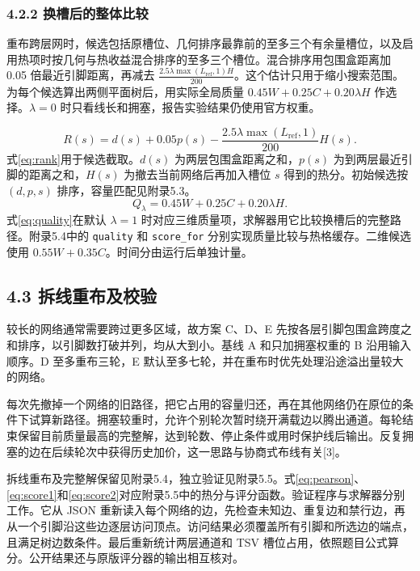 \documentclass[12pt,a4paper]{article}
\begin{document}
\subsubsection{4.2.2
换槽后的整体比较}\label{ux6362ux69fdux540eux7684ux6574ux4f53ux6bd4ux8f83}

重布跨层网时，候选包括原槽位、几何排序最靠前的至多三个有余量槽位，以及启用热项时按几何与热收益混合排序的至多三个槽位。混合排序用包围盒距离加
0.05 倍最近引脚距离，再减去
\(\frac{2.5\lambda\max(L_{\mathrm{ref}},1)H}{200}\)。这个估计只用于缩小搜索范围。为每个候选算出两侧平面树后，用实际全局质量
\(0.45W+0.25C+0.20\lambda H\) 作选择。\(\lambda=0\)
时只看线长和拥塞，报告实验结果仍使用官方权重。

\begin{equation}
R(s)=d(s)+0.05p(s)-\frac{2.5\lambda\max(L_{\mathrm{ref}},1)}{200}H(s).
\label{eq:rank}
\end{equation}
式\eqref{eq:rank}用于候选截取。$d(s)$ 为两层包围盒距离之和，$p(s)$ 为到两层最近引脚的距离之和，$H(s)$ 为撤去当前网络后再加入槽位 $s$ 得到的热分。初始候选按 $(d,p,s)$ 排序，容量匹配见附录5.3。
\begin{equation}
Q_{\lambda}=0.45W+0.25C+0.20\lambda H.
\label{eq:quality}
\end{equation}
式\eqref{eq:quality}在默认 $\lambda=1$ 时对应三维质量项，求解器用它比较换槽后的完整路径。附录5.4中的 \texttt{quality} 和 \texttt{score\_for} 分别实现质量比较与热格缓存。二维候选使用 $0.55W+0.35C$。时间分由运行后单独计量。
\subsection{4.3
拆线重布及校验}\label{ux62c6ux7ebfux91cdux5e03ux53caux6821ux9a8c}

较长的网络通常需要跨过更多区域，故方案 C、D、E
先按各层引脚包围盒跨度之和排序，以引脚数打破并列，均从大到小。基线 A
和只加拥塞权重的 B 沿用输入顺序。D 至多重布三轮，E
默认至多七轮，并在重布时优先处理沿途溢出量较大的网络。

每次先撤掉一个网络的旧路径，把它占用的容量归还，再在其他网络仍在原位的条件下试算新路径。拥塞较重时，允许个别轮次暂时绕开满载边以腾出通道。每轮结束保留目前质量最高的完整解，达到轮数、停止条件或用时保护线后输出。反复拥塞的边在后续轮次中获得历史加价，这一思路与协商式布线有关{[}3{]}。

拆线重布及完整解保留见附录5.4，独立验证见附录5.5。式\eqref{eq:pearson}、\allowbreak\eqref{eq:score1}和\allowbreak\eqref{eq:score2}对应附录5.5中的热分与评分函数。验证程序与求解器分别工作。它从 JSON
重新读入每个网络的边，先检查未知边、重复边和禁行边，再从一个引脚沿这些边逐层访问顶点。访问结果必须覆盖所有引脚和所选边的端点，且满足树边数条件。最后重新统计两层通道和
TSV 槽位占用，依照题目公式算分。公开结果还与原版评分器的输出相互核对。
\end{document}
